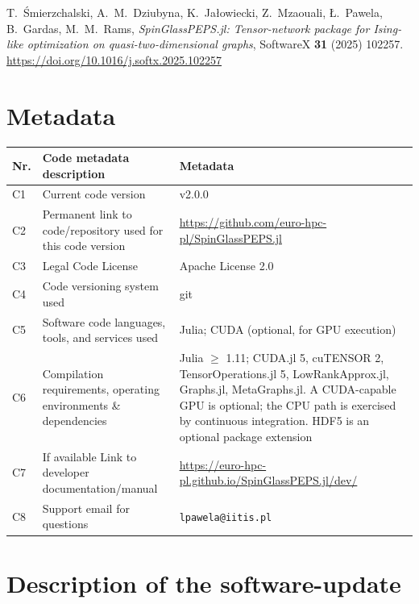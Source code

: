 \documentclass[preprint,12pt,a4paper]{elsarticle}
\begin{document}
T.~\'Smierzchalski, A.~M.~Dziubyna, K.~Ja\l{}owiecki, Z.~Mzaouali, \L{}.~Pawela,
B.~Gardas, M.~M.~Rams, \emph{SpinGlassPEPS.jl: Tensor-network package for
Ising-like optimization on quasi-two-dimensional graphs}, SoftwareX \textbf{31}
(2025) 102257. \url{https://doi.org/10.1016/j.softx.2025.102257}

\section*{Metadata}
\label{metadata}

\begin{table}[H]
\begin{tabular}{|l|p{5.9cm}|p{5.9cm}|}
\hline
Nr. & Code metadata description & Metadata \\
\hline
C1 & Current code version & v2.0.0 \\
\hline
C2 & Permanent link to code/repository used for this code version &
\url{https://github.com/euro-hpc-pl/SpinGlassPEPS.jl} \\
\hline
C3 & Legal Code License & Apache License 2.0 \\
\hline
C4 & Code versioning system used & git \\
\hline
C5 & Software code languages, tools, and services used & Julia; CUDA (optional,
for GPU execution) \\
\hline
C6 & Compilation requirements, operating environments \& dependencies & Julia
$\geq$ 1.11; CUDA.jl 5, cuTENSOR 2, TensorOperations.jl 5, LowRankApprox.jl,
Graphs.jl, MetaGraphs.jl. A CUDA-capable GPU is optional; the CPU path is
exercised by continuous integration. HDF5 is an optional package extension \\
\hline
C7 & If available Link to developer documentation/manual &
\url{https://euro-hpc-pl.github.io/SpinGlassPEPS.jl/dev/} \\
\hline
C8 & Support email for questions & \texttt{lpawela@iitis.pl} \\
\hline
\end{tabular}
\end{table}

\linenumbers

\section{Description of the software-update}
\label{Description of the software-update}
\end{document}

